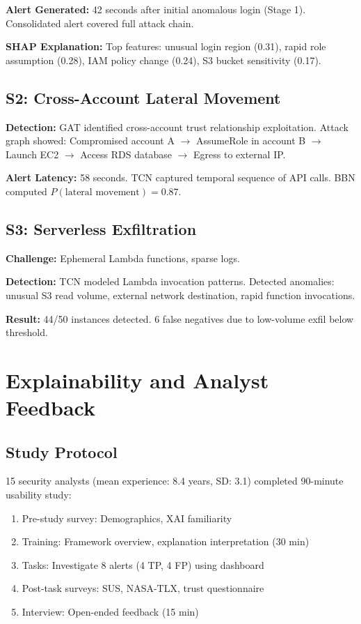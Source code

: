 \textbf{Alert Generated:} 42 seconds after initial anomalous login (Stage 1). Consolidated alert covered full attack chain.

\textbf{SHAP Explanation:} Top features: unusual login region (0.31), rapid role assumption (0.28), IAM policy change (0.24), S3 bucket sensitivity (0.17).

\subsection{S2: Cross-Account Lateral Movement}
\textbf{Detection:} GAT identified cross-account trust relationship exploitation. Attack graph showed: Compromised account A $\rightarrow$ AssumeRole in account B $\rightarrow$ Launch EC2 $\rightarrow$ Access RDS database $\rightarrow$ Egress to external IP.

\textbf{Alert Latency:} 58 seconds. TCN captured temporal sequence of API calls. BBN computed $P(\text{lateral movement}) = 0.87$.

\subsection{S3: Serverless Exfiltration}
\textbf{Challenge:} Ephemeral Lambda functions, sparse logs.

\textbf{Detection:} TCN modeled Lambda invocation patterns. Detected anomalies: unusual S3 read volume, external network destination, rapid function invocations.

\textbf{Result:} 44/50 instances detected. 6 false negatives due to low-volume exfil below threshold.

\section{Explainability and Analyst Feedback}\label{sec:eval-xai}
\subsection{Study Protocol}
15 security analysts (mean experience: 8.4 years, SD: 3.1) completed 90-minute usability study:
\begin{enumerate}
    \item Pre-study survey: Demographics, XAI familiarity
    \item Training: Framework overview, explanation interpretation (30 min)
    \item Tasks: Investigate 8 alerts (4 TP, 4 FP) using dashboard
    \item Post-task surveys: SUS, NASA-TLX, trust questionnaire
    \item Interview: Open-ended feedback (15 min)
\end{enumerate}

